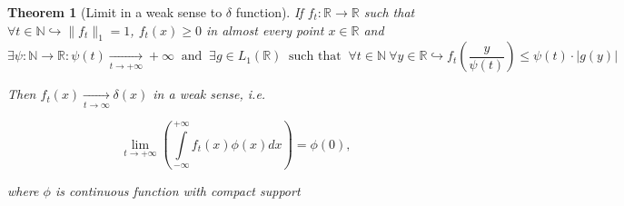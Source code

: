 \documentclass{article}
\newtheorem{theorem}{Theorem}
\begin{document}
    \begin{theorem}[Limit in a weak sense to $\delta$ function] \label{delta}
        If $f_t : \mathbb{R} \to \mathbb{R}$ such that $\forall t \in \mathbb{N} \hookrightarrow  \|f_t\|_1 = 1$, $f_t(x) \geq 0$ in almost every point $x \in \mathbb{R}$ and
        \begin{equation} \label{psi_and_g}
            \exists \psi : \mathbb{N} \to \mathbb{R} : \psi(t) \underset{t \to +\infty}{\longrightarrow} +\infty ~\text{ and }~
            \exists g \in L_1(\mathbb{R}) ~\text{ such that }~ \forall t \in \mathbb{N} ~\forall y \in \mathbb{R} \hookrightarrow f_t\left(\dfrac{y}{\psi(t)}\right) \leq \psi(t) \cdot |g(y)|
        \end{equation}

        Then $f_t(x) \underset{t \to \infty}{\longrightarrow} \delta(x)$ in a weak sense, i.e.

        \begin{equation}
            \underset{t \to +\infty}{\lim}\left(\int\limits_{-\infty}^{+\infty} f_t(x) \phi(x) dx\right) = \phi(0),
        \end{equation}

        where $\phi$ is continuous function with compact support
    \end{theorem}
\end{document}
